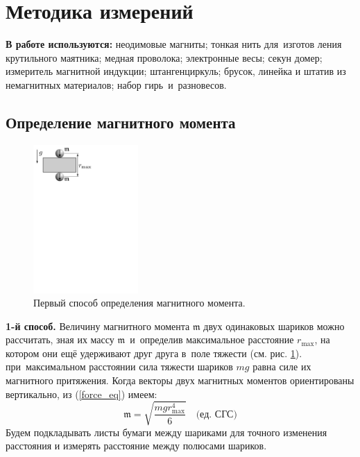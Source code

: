 \documentclass[12pt, a4paper]{article}
\newcommand{\m}{\mathfrak{m}}
\newcommand{\cgs}{\quad\text{(ед. СГС)}}
\begin{document}
\section{Методика измерений}
\textbf{В работе используются:} неодимовые магниты; тонкая нить для~изготов­
ления крутильного маятника; медная проволока; электронные весы; секун­
домер; измеритель магнитной индукции; штангенциркуль; брусок, линейка
и штатив из немагнитных материалов; набор гирь~и~разновесов.
\newpage
\subsection{Определение магнитного момента}
\begin{figure}\vspace{-12mm}
\centering
	\includegraphics[width=4cm]{pics/m_offset.pdf}
	\caption{Первый способ определения магнитного момента.}
	\label{m_offset_pic}
\end{figure}

\textbf{1-й способ.} Величину магнитного момента $\m$ двух одинаковых шариков можно рассчитать, зная их массу $\m$~и~определив максимальное расстояние $r_\text{max}$, на котором они ещё удерживают друг друга в~поле тяжести (см. рис. \ref{m_offset_pic}). при~максимальном расстоянии сила тяжести шариков $mg$ равна силе их магнитного притяжения. Когда векторы двух магнитных моментов ориентированы вертикально, из (\ref{force_eq}) имеем: 
\begin{equation}
\m = \sqrt{\dfrac{mgr_\text{max}^4}{6}}\cgs
\label{m_offset}
\end{equation}
Будем подкладывать листы бумаги между шариками для точного изменения расстояния и измерять расстояние между полюсами шариков.
\end{document}
